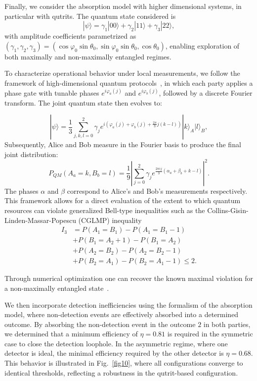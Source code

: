 \documentclass[aps,pra,reprint, superscriptaddress,showkeys]{revtex4-2}
\theoremstyle{plain}
\begin{document}
Finally, we consider the absorption model  with higher dimensional systems, in particular with qutrits.
 The quantum state considered is
\begin{equation}
|\psi\rangle = \gamma_1 |00\rangle + \gamma_2 |11\rangle + \gamma_3 |22\rangle,
\end{equation}
with amplitude coefficients parametrized as $(\gamma_1, \gamma_2, \gamma_3) = (\cos \varphi_0 \sin \theta_0, \sin \varphi_0 \sin \theta_0, \cos \theta_0)$, enabling exploration of both maximally and non-maximally entangled regimes.

To characterize operational behavior under local measurements, we follow the framework of high-dimensional quantum protocols~\cite{Collins2002}, in which each party applies a phase gate with tunable phases $e^{i\varphi_a(j)}$ and $e^{i\varphi_b(j)}$, followed by a discrete Fourier transform. The joint quantum state then evolves to:

\begin{equation}
|\psi\rangle = \frac{1}{3} \sum_{j,k,l=0}^2 \gamma_j e^{i(\varphi_a(j) + \varphi_b(j) + \frac{2\pi}{3} j(k - l))} |k\rangle_A |l\rangle_B,
\end{equation}
Subsequently, Alice and Bob measure in the Fourier basis to produce the final joint distribution:
\begin{equation}
P_{QM}(A_a = k, B_b = l) = \frac{1}{9} \left| \sum_{j=0}^2 \gamma_j e^{\frac{2\pi i j}{3} (\alpha_a + \beta_b + k - l)} \right|^2.
\end{equation}
The phases $\alpha$ and $\beta$ correspond to Alice's and Bob's measurements respectively.
This framework allows for a direct evaluation of the extent to which quantum resources can violate generalized Bell-type inequalities such as the Collins-Gisin-Linden-Massar-Popescu (CGLMP) inequality~\cite{Collins2002} 
\begin{align}
    I_3 &= P(A_1=B_1) - P(A_1=B_1-1)  \nonumber \\
    &+ P(B_1=A_2+1) - P(B_1=A_2)  \nonumber\\ 
    &+ P(A_2=B_2) - P(A_2=B_2-1)   \nonumber\\
    &+ P(B_2=A_1) - P(B_2=A_1-1)  \le 2.
\end{align}


Through numerical optimization one can recover the known maximal violation for a non-maximally entangled state~\cite{Acin2002}.

We then incorporate detection inefficiencies using the formalism of the absorption model, where non-detection events are effectively absorbed into a determined outcome. By absorbing the non-detection event in the outcome $2$ in both parties, we determined that a minimum efficiency of $\eta = 0.81$ is required in the symmetric case to close the detection loophole. In the asymmetric regime, where one detector is ideal, the minimal efficiency required by the other detector is $\eta = 0.68$. This behavior is illustrated in Fig.~\ref{fig10}, where all configurations converge to identical thresholds, reflecting a robustness in the qutrit-based configuration.
\end{document}
